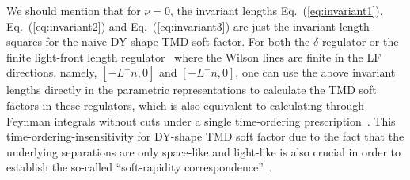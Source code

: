 \documentclass[a4paper,11pt]{article}
\begin{document}
We should mention that for $\nu=0$, the invariant lengths Eq.~(\ref{eq:invariant1}), Eq.~(\ref{eq:invariant2}) and Eq.~(\ref{eq:invariant3}) are just the invariant length squares for the naive DY-shape TMD soft factor. For both the $\delta$-regulator or the finite light-front length regulator~\cite{Vladimirov:2017ksc,Vladimirov:2020umg} where the Wilson lines are finite in the LF directions, namely, $[-L^+n,0]$ and $[-L^-n,0]$, one can use the above invariant lengths directly in the parametric representations to calculate the TMD soft factors in these regulators, which is also equivalent to calculating through Feynman integrals without cuts under a single time-ordering prescription~\cite{Vladimirov:2016qkd,Vladimirov:2017ksc}. This time-ordering-insensitivity for DY-shape TMD soft factor due to the fact that the underlying separations are only space-like and light-like is also crucial in order to establish the so-called ``soft-rapidity correspondence''~\cite{Vladimirov:2016dll, Vladimirov:2017ksc}.
\end{document}
